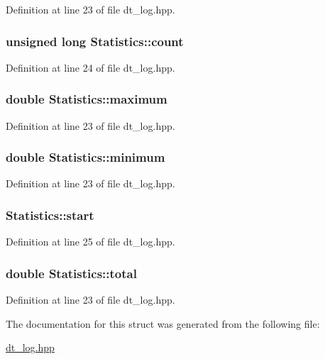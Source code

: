 Definition at line 23 of file dt\_\-log.hpp.\hypertarget{struct_statistics_a91bc9e0f5355e1d2fcd6a308149e2ace}{
\subsubsection[{count}]{\setlength{\rightskip}{0pt plus 5cm}unsigned long {\bf Statistics::count}}}
\label{struct_statistics_a91bc9e0f5355e1d2fcd6a308149e2ace}


Definition at line 24 of file dt\_\-log.hpp.\hypertarget{struct_statistics_aa579bead66071a595a709b6049d17be6}{
\subsubsection[{maximum}]{\setlength{\rightskip}{0pt plus 5cm}double {\bf Statistics::maximum}}}
\label{struct_statistics_aa579bead66071a595a709b6049d17be6}


Definition at line 23 of file dt\_\-log.hpp.\hypertarget{struct_statistics_a8474c5e63820e090f6fb4805c2c50d2b}{
\subsubsection[{minimum}]{\setlength{\rightskip}{0pt plus 5cm}double {\bf Statistics::minimum}}}
\label{struct_statistics_a8474c5e63820e090f6fb4805c2c50d2b}


Definition at line 23 of file dt\_\-log.hpp.\hypertarget{struct_statistics_a53f28ccde1c94e356405afffe1e10ed6}{
\subsubsection[{start}]{ {\bf Statistics::start}}}
\label{struct_statistics_a53f28ccde1c94e356405afffe1e10ed6}


Definition at line 25 of file dt\_\-log.hpp.\hypertarget{struct_statistics_af3abef91cebaeede5182f4e0b8d0a95c}{
\subsubsection[{total}]{\setlength{\rightskip}{0pt plus 5cm}double {\bf Statistics::total}}}
\label{struct_statistics_af3abef91cebaeede5182f4e0b8d0a95c}


Definition at line 23 of file dt\_\-log.hpp.

The documentation for this struct was generated from the following file:\begin{DoxyCompactItemize}
\item 
\hyperlink{dt__log_8hpp}{dt\_\-log.hpp}\end{DoxyCompactItemize}
